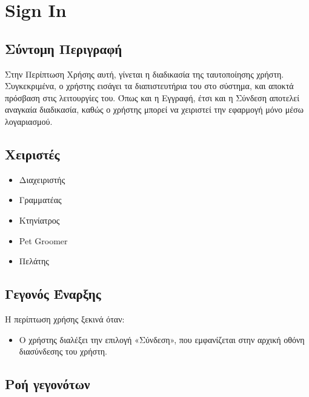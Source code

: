 \documentclass[12pt,a4paper,twoside]{book}
\begin{document}
\section{Sign In} %

\subsection{Σύντομη Περιγραφή}
Στην Περίπτωση Χρήσης αυτή, γίνεται η διαδικασία της ταυτοποίησης χρήστη. Συγκεκριμένα, ο χρήστης εισάγει τα διαπιστευτήρια του στο σύστημα, και αποκτά πρόσβαση στις λειτουργίες του. Όπως και η Εγγραφή, έτσι και η Σύνδεση αποτελεί αναγκαία διαδικασία, καθώς ο χρήστης μπορεί να χειριστεί την εφαρμογή μόνο μέσω λογαριασμού.%

\subsection{Χειριστές}
\begin{itemize}
  \item Διαχειριστής
  \item Γραμματέας
  \item Κτηνίατρος
  \item Pet Groomer
  \item Πελάτης
\end{itemize}

\subsection{Γεγονός Έναρξης}
Η περίπτωση χρήσης ξεκινά όταν:
\begin{itemize}
  \item Ο χρήστης διαλέξει την επιλογή «Σύνδεση», που εμφανίζεται στην αρχική οθόνη διασύνδεσης του χρήστη. %
\end{itemize}

\subsection{Ροή γεγονότων}
\end{document}
